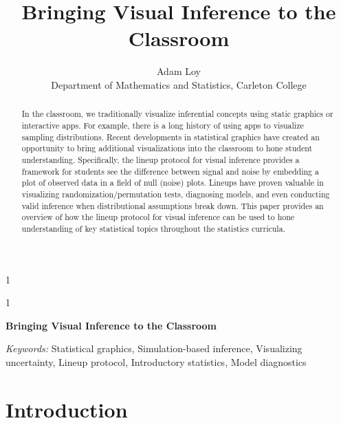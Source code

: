 \documentclass[12pt]{article}
\newcommand{\blind}{1}
\begin{document}
\def\spacingset#1{\renewcommand{\baselinestretch}%
{#1}\small\normalsize} \spacingset{1}



\blind
{
  \title{\bf Bringing Visual Inference to the Classroom}

  \author{
        Adam Loy \\
    Department of Mathematics and Statistics, Carleton College\\
      }
  \maketitle
} \fi

\blind
{
  \bigskip
  \bigskip
  \bigskip
  \begin{center}
    {\LARGE\bf Bringing Visual Inference to the Classroom}
  \end{center}
  \medskip
} \fi

\bigskip
\begin{abstract}
In the classroom, we traditionally visualize inferential concepts using
static graphics or interactive apps. For example, there is a long
history of using apps to visualize sampling distributions. Recent
developments in statistical graphics have created an opportunity to
bring additional visualizations into the classroom to hone student
understanding. Specifically, the lineup protocol for visual inference
provides a framework for students see the difference between signal and
noise by embedding a plot of observed data in a field of null (noise)
plots. Lineups have proven valuable in visualizing
randomization/permutation tests, diagnosing models, and even conducting
valid inference when distributional assumptions break down. This paper
provides an overview of how the lineup protocol for visual inference can
be used to hone understanding of key statistical topics throughout the
statistics curricula.
\end{abstract}

\noindent%
{\it Keywords:} Statistical graphics, Simulation-based inference, Visualizing uncertainty, Lineup protocol, Introductory statistics, Model diagnostics
\vfill

\newpage
\spacingset{1.45} %

\hypertarget{introduction}{%
\section{Introduction}\label{introduction}}
\end{document}
